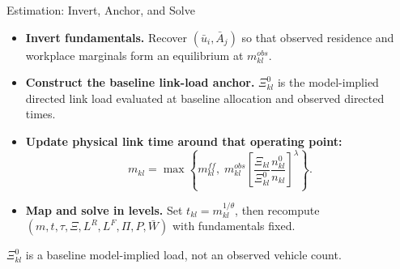 \documentclass[11pt,aspectratio=169]{beamer}
\begin{document}
\begin{frame}{Estimation: Invert, Anchor, and Solve}
\begin{itemize}\small
  \item \textbf{Invert fundamentals.} Recover $(\bar u_i,\bar A_j)$ so that observed residence and workplace marginals form an equilibrium at $m_{kl}^{obs}$.
  \item \textbf{Construct the baseline link-load anchor.} $\Xi_{kl}^{0}$ is the model-implied directed link load evaluated at baseline allocation and observed directed times.
  \item \textbf{Update physical link time around that operating point:}
  \vspace{-0.45em}\begin{equation}\label{eq:anchor}
    m_{kl}=\max\!\left\{
    m_{kl}^{ff},\;
    m_{kl}^{obs}
    \left[
    \frac{\Xi_{kl}}{\Xi_{kl}^{0}}
    \frac{n_{kl}^{0}}{n_{kl}}
    \right]^{\lambda}
    \right\}.
  \end{equation}
  \vspace{-0.65em}
  \item \textbf{Map and solve in levels.} Set $t_{kl}=m_{kl}^{1/\theta}$, then recompute $(m,t,\tau,\Xi,L^R,L^F,\Pi,P,\bar W)$ with fundamentals fixed.
\end{itemize}
\vspace{-0.25em}
\begin{center}\footnotesize
$\Xi_{kl}^{0}$ is a baseline model-implied load, not an observed vehicle count.
\end{center}
\end{frame}
\end{document}
